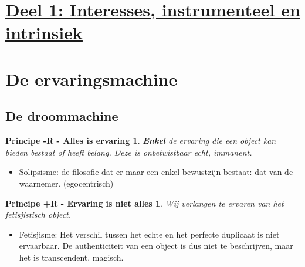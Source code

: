 \section*{\centering \underline{Deel 1: Interesses, instrumenteel en intrinsiek}}

\section{De ervaringsmachine}
\subsection{De droommachine}
\newtheorem*{-R}{Principe -R - Alles is ervaring}
	\begin{-R}
	\textbf{Enkel} de ervaring die een object kan bieden bestaat of heeft belang.
	\newline Deze is onbetwistbaar echt, immanent.
	\end{-R}
	\begin{itemize}
	\item Solipsisme: de filosofie dat er maar een enkel bewustzijn bestaat: dat van de waarnemer. (egocentrisch)
	\end{itemize}
\newtheorem*{+R}{Principe +R - Ervaring is niet alles}
	\begin{+R}
	Wij verlangen te ervaren van het fetisjistisch object.
	\end{+R}
	\begin{itemize}
	\item Fetisjisme: Het verschil tussen het echte en het perfecte duplicaat is niet ervaarbaar. De authenticiteit van een object is dus niet te beschrijven, maar het is transcendent, magisch.
	\end{itemize}



